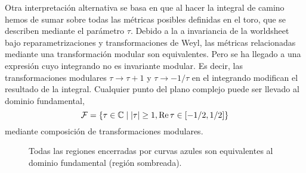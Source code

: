Otra interpretación alternativa se basa en que al hacer la integral de camino hemos de sumar sobre 
todas las métricas posibles definidas en el toro, que se describen mediante el parámetro $\tau$.
Debido a la a invariancia de la worldsheet bajo reparametrizaciones y transformaciones de Weyl,
las métricas relacionadas mediante una transformación modular son equivalentes.
Pero se ha llegado a una expresión cuyo integrando no es invariante modular.
Es decir, las
transformaciones modulares $\tau\to\tau+1$ y $\tau\to-1/\tau$ en el integrando modifican el resultado
de la integral.
Cualquier punto del plano complejo puede ser llevado al dominio fundamental,
\begin{equation}
  \mathcal F = \qty{ \tau \in \mathbb{C} \mid \abs{\tau} \geq 1, \Re\tau \in [-1/2,1/2]}
\end{equation}
mediante composición de transformaciones modulares.

\begin{figure}[htb]
  \centering 



 \caption{Todas las regiones encerradas por curvas azules son equivalentes al dominio fundamental (región sombreada).
}                   
\label{fig:dom}
\end{figure}


